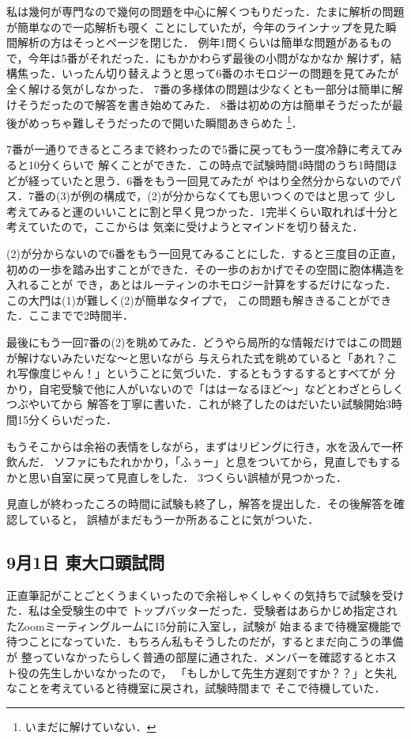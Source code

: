 \documentclass[dvipdfmx,uplatex]{jsarticle}
\begin{document}
私は幾何が専門なので幾何の問題を中心に解くつもりだった．たまに解析の問題が簡単なので一応解析も覗く
ことにしていたが，今年のラインナップを見た瞬間解析の方はそっとページを閉じた．
例年1問くらいは簡単な問題があるもので，今年は5番がそれだった．にもかかわらず最後の小問がなかなか
解けず，結構焦った．いったん切り替えようと思って6番のホモロジーの問題を見てみたが全く解ける気がしなかった．
7番の多様体の問題は少なくとも一部分は簡単に解けそうだったので解答を書き始めてみた．
8番は初めの方は簡単そうだったが最後がめっちゃ難しそうだったので開いた瞬間あきらめた
\footnote{いまだに解けていない．}．

7番が一通りできるところまで終わったので5番に戻ってもう一度冷静に考えてみると10分くらいで
解くことができた．この時点で試験時間4時間のうち1時間ほどが経っていたと思う．6番をもう一回見てみたが
やはり全然分からないのでパス．7番の(3)が例の構成で，(2)が分からなくても思いつくのではと思って
少し考えてみると運のいいことに割と早く見つかった．1完半くらい取れれば十分と考えていたので，ここからは
気楽に受けようとマインドを切り替えた．

(2)が分からないので6番をもう一回見てみることにした．すると三度目の正直，
初めの一歩を踏み出すことができた．その一歩のおかげでその空間に胞体構造を入れることが
でき，あとはルーティンのホモロジー計算をするだけになった．この大門は(1)が難しく(2)が簡単なタイプで，
この問題も解ききることができた．ここまでで2時間半．

最後にもう一回7番の(2)を眺めてみた．どうやら局所的な情報だけではこの問題が解けないみたいだな～と思いながら
与えられた式を眺めていると「あれ？これ写像度じゃん！」ということに気づいた．するともうするするとすべてが
分かり，自宅受験で他に人がいないので「ははーなるほど～」などとわざとらしくつぶやいてから
解答を丁寧に書いた．これが終了したのはだいたい試験開始3時間15分くらいだった．

もうそこからは余裕の表情をしながら，まずはリビングに行き，水を汲んで一杯飲んだ．
ソファにもたれかかり，「ふぅー」と息をついてから，見直しでもするかと思い自室に戻って見直しをした．
3つくらい誤植が見つかった．

見直しが終わったころの時間に試験も終了し，解答を提出した．その後解答を確認していると，
誤植がまだもう一か所あることに気がついた．

\subsection{9月1日 東大口頭試問}
正直筆記がことごとくうまくいったので余裕しゃくしゃくの気持ちで試験を受けた．私は全受験生の中で
トップバッターだった．受験者はあらかじめ指定されたZoomミーティングルームに15分前に入室し，試験が
始まるまで待機室機能で待つことになっていた．もちろん私もそうしたのだが，するとまだ向こうの準備が
整っていなかったらしく普通の部屋に通された．メンバーを確認するとホスト役の先生しかいなかったので，
「もしかして先生方遅刻ですか？？」と失礼なことを考えていると待機室に戻され，試験時間まで
そこで待機していた．
\end{document}
